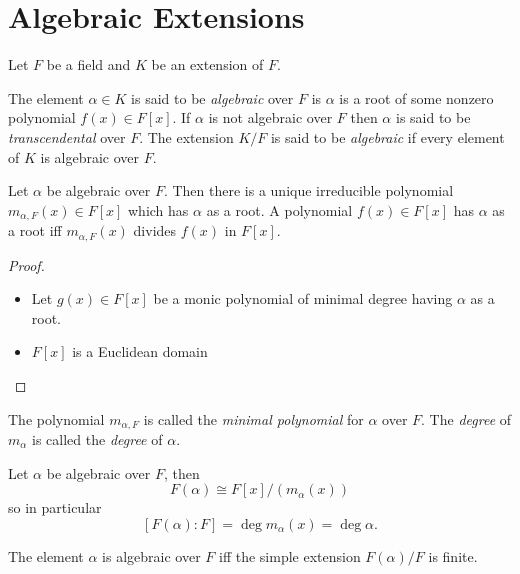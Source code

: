 \documentclass[a4paper]{article}
\begin{document}
\section{Algebraic Extensions}

Let $F$ be a field and $K$ be an extension of $F$.

\begin{definition}
  The element $\alpha\in K$ is said to be \emph{algebraic} over $F$ is $\alpha$ is a root of some nonzero polynomial $f(x)\in F[x]$. If $\alpha$ is not algebraic over $F$ then $\alpha$ is said to be \emph{transcendental} over $F$. The extension $K/F$ is said to be \emph{algebraic} if every element of $K$ is algebraic over $F$.
\end{definition}

\begin{proposition}
  Let $\alpha$ be algebraic over $F$. Then there is a unique irreducible polynomial $m_{\alpha,F}(x)\in F[x]$ which has $\alpha$ as a root. A polynomial $f(x)\in F[x]$ has $\alpha$ as a root iff $m_{\alpha,F}(x)$ divides $f(x)$ in $F[x]$.
\end{proposition}

\begin{proof}\leavevmode
  \begin{itemize}
  \item Let $g(x)\in F[x]$ be a monic polynomial of minimal degree having $\alpha$ as a root.
  \item $F[x]$ is a Euclidean domain
  \end{itemize}
\end{proof}

\begin{definition}
  The polynomial $m_{\alpha,F}$ is called the \emph{minimal polynomial} for $\alpha$ over $F$. The \emph{degree} of $m_\alpha$ is called the \emph{degree} of $\alpha$.
\end{definition}

\begin{proposition}
  Let $\alpha$ be algebraic over $F$, then
  \[
    F(\alpha) \cong F[x]/(m_\alpha(x))
  \]
  so in particular
  \[
    [F(\alpha):F] = \deg m_\alpha(x) = \deg \alpha.
  \]
\end{proposition}

\begin{proposition}
  The element $\alpha$ is algebraic over $F$ iff the simple extension $F(\alpha)/F$ is finite.
\end{proposition}
\end{document}
